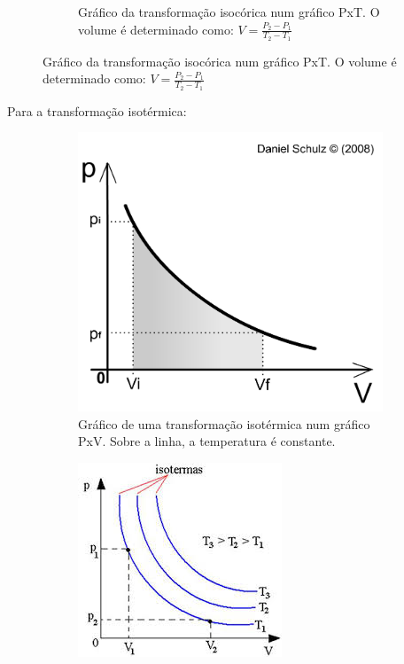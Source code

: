 \documentclass[12pt]{extarticle}
\newcommand{\<}{\langle}
\renewcommand{\>}{\rangle}
\theoremstyle{definition}
\begin{document}
\begin{figure}[H]
\begin{subfigure}[b]{0.45\textwidth}
         \caption{Gráfico da transformação isocórica num gráfico PxT. O volume é determinado como: $V=\frac{P_2-P_1}{T_2-T_1}$}
         \label{fig:isocorica_pt}
     \end{subfigure}
\end{figure}

Para a transformação isotérmica:
\begin{figure}[H]
     \centering
     \begin{subfigure}[b]{0.45\textwidth}
         \centering
         \includegraphics[width=\textwidth]{isoterma_area.jpg}
         \caption{Gráfico de uma transformação isotérmica num gráfico PxV. Sobre a linha, a temperatura é constante.}
         \label{fig:isoterma}
     \end{subfigure}
     \hfill
     \begin{subfigure}[b]{0.45\textwidth}
         \centering
         \includegraphics[width=\textwidth]{isotermica.jpg}

\end{subfigure}
\end{figure}
\end{document}
